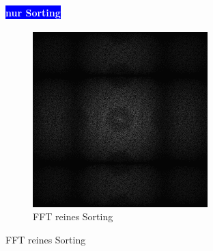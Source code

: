 \begin{figure}[H]
    
    \begin{tcolorbox}[sidebyside,title=Vergleich mit/ohne Retargeting]
        \paragraph{\hfill\colorbox{blue}{\textcolor{white}{nur Sorting}}}
        \centering
        \begin{subfigure}{0.5\textwidth}
            \centering\includegraphics[width=\linewidth]{content/TemporalerAlg/Bilder/Sorting/Spektren/Ausschnitt7.png} 
            \caption{FFT reines Sorting}
            \label{fig:VergleichSorting}
        \end{subfigure}
    \tcblower

\end{tcolorbox}
\end{figure}

